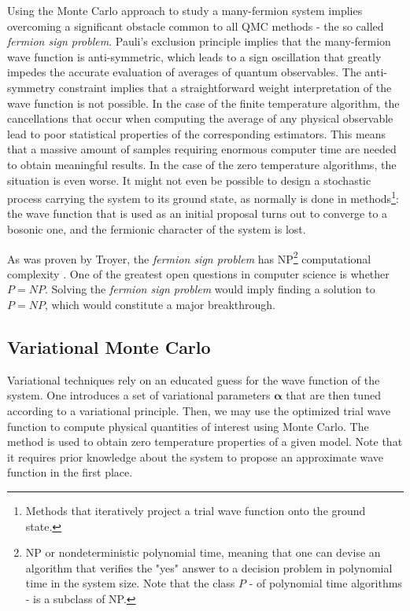 Using the Monte Carlo approach to study a many-fermion system implies overcoming a significant obstacle common to all \ac{QMC} methods - the so called \emph{fermion sign problem}.
Pauli's exclusion principle implies that the many-fermion wave function is anti-symmetric, which leads to a sign oscillation that greatly impedes the accurate evaluation of averages of quantum observables.
The anti-symmetry constraint implies that a  straightforward weight interpretation of the wave function is not possible.
In the case of the finite temperature algorithm, the cancellations that occur when computing the average of any physical observable lead to poor statistical properties of the corresponding estimators.
This means that a massive amount of samples requiring enormous computer time are needed to obtain meaningful results.
In the case of the zero temperature algorithms, the situation is even worse.
It might not even be possible to design a stochastic process carrying the system to its ground state, as normally is done in  methods\footnote{Methods that iteratively project a trial wave function onto the ground state.}: the wave function that is used as an initial proposal turns out to converge to a bosonic one, and the fermionic character of the system is lost.

As was proven by Troyer, the \emph{fermion sign problem} has NP\footnote{NP or nondeterministic polynomial time, meaning that one can devise an algorithm that verifies the "yes" answer to a decision problem in polynomial time in the system size.
Note that the class $P$ - of polynomial time algorithms - is a subclass of NP.} computational complexity \cite{troyer_computational_2005}.
One of the greatest open questions in computer science is whether $P = NP$.
Solving the \emph{fermion sign problem} would imply finding a solution to $P = NP$, which would constitute a major breakthrough.

\subsection{Variational Monte Carlo}

Variational techniques rely on an educated guess for the wave function of the system.
One introduces a set of variational parameters $\bm \alpha$ that are then tuned according to a variational principle.
Then, we may use the optimized trial wave function to compute physical quantities of interest using Monte Carlo.
The method is used to obtain zero temperature properties of a given model.
Note that it requires prior knowledge about the system to propose an approximate wave function in the first place.

